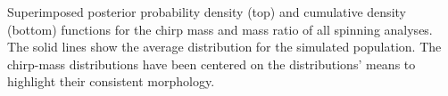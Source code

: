 \label{fig:mass_pdfs} Superimposed posterior probability density (top) and cumulative density (bottom) functions for the chirp mass and mass ratio of all spinning analyses.  The solid lines show the average distribution for the simulated population.  The chirp-mass distributions have been centered on the distributions' means to highlight their consistent morphology.
  